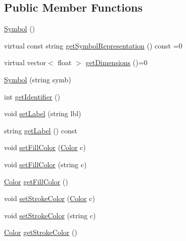 \subsection*{Public Member Functions}
\begin{DoxyCompactItemize}
\item 
\hyperlink{classbridges_1_1datastructure_1_1_symbol_a6169106c021d20752abba3cd266ecfb0}{Symbol} ()
\item 
virtual const string \hyperlink{classbridges_1_1datastructure_1_1_symbol_a8044b3da559dcd9de8510ae339f126c8}{get\+Symbol\+Representation} () const =0
\item 
virtual vector$<$ float $>$ \hyperlink{classbridges_1_1datastructure_1_1_symbol_a37ba60b6acdd0888677eb8c64a931679}{get\+Dimensions} ()=0
\item 
\hyperlink{classbridges_1_1datastructure_1_1_symbol_adaeede160240bcc959d1813c5cb79528}{Symbol} (string symb)
\item 
int \hyperlink{classbridges_1_1datastructure_1_1_symbol_ac4b6cfcf91217d66ed0694080846970f}{get\+Identifier} ()
\item 
void \hyperlink{classbridges_1_1datastructure_1_1_symbol_a34609dd22e5043c39d40524d05e337b0}{set\+Label} (string lbl)
\item 
string \hyperlink{classbridges_1_1datastructure_1_1_symbol_a549906b96da5d53b964844ca5f593b7f}{get\+Label} () const
\item 
void \hyperlink{classbridges_1_1datastructure_1_1_symbol_a3019a17458fe5f0381cfd611338af6f7}{set\+Fill\+Color} (\hyperlink{classbridges_1_1datastructure_1_1_color}{Color} c)
\item 
void \hyperlink{classbridges_1_1datastructure_1_1_symbol_ad7b92720fe76b59f1922fe25c967f442}{set\+Fill\+Color} (string c)
\item 
\hyperlink{classbridges_1_1datastructure_1_1_color}{Color} \hyperlink{classbridges_1_1datastructure_1_1_symbol_a4b29601e24832077a15321af5c71cfdf}{get\+Fill\+Color} ()
\item 
void \hyperlink{classbridges_1_1datastructure_1_1_symbol_ad98bc6de925ff8ee2274298e42617fc8}{set\+Stroke\+Color} (\hyperlink{classbridges_1_1datastructure_1_1_color}{Color} c)
\item 
void \hyperlink{classbridges_1_1datastructure_1_1_symbol_af5f15111c67cfd63d3b0b3dc70442d0c}{set\+Stroke\+Color} (string c)
\item 
\hyperlink{classbridges_1_1datastructure_1_1_color}{Color} \hyperlink{classbridges_1_1datastructure_1_1_symbol_aa99d36f97deaf99bee1d61778c85e87d}{get\+Stroke\+Color} ()

\end{DoxyCompactItemize}
